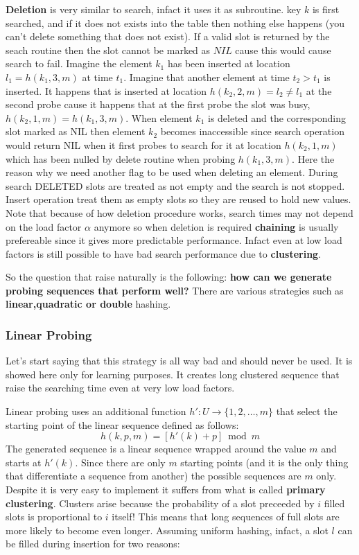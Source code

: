 \textbf{Deletion} is very similar to search, infact it uses it as subroutine. key $k$ is first searched, and if it does not exists into the table then nothing else happens (you can't delete something that does not exist). If a valid slot is returned by the seach routine then the slot cannot be marked as $NIL$ cause this would cause search to fail. Imagine the element $k_1$ has been inserted at location $l_1=h(k_1,3,m)$ at time $t_1$. Imagine that another element at time $t_2 > t_1$ is inserted. It happens that is  inserted at location $h(k_2,2,m)=l_2 \neq l_1$  at the second probe cause it happens that at the first probe the slot was busy, $h(k_2,1,m)= h(k_1,3,m)$. When element $k_1$ is deleted and the corresponding slot marked as NIL then element $k_2$ becomes inaccessible since search operation would return NIL when it first probes to search for it at location $h(k_2,1,m)$ which has been nulled by delete routine when probing $h(k_1,3,m)$. Here the reason why we need another flag to be used when deleting an element.
During search DELETED slots are treated as not empty and the search is not stopped. Insert operation treat them as empty slots so they are reused to hold new values.
Note that because of how deletion procedure works, search times may not depend on the load factor $\alpha$ anymore so when deletion is required \textbf{chaining} is usually prefereable since it gives more predictable performance. Infact even at low load factors is still possible to have bad search performance due to \textbf{clustering}. 

So the question that raise naturally is the following: \textbf{how can we generate probing sequences that perform well?}
There are various strategies such as \textbf{linear,quadratic or double} hashing.
\subsubsection{Linear Probing}
Let's start saying that this strategy is all way bad and should never be used. It is showed here only for learning purposes. It creates long clustered sequence that raise the searching time even at very low load factors. 

Linear probing uses an additional function $h':U \rightarrow \{	1,2,\ldots, m\} $ that select the starting point of the linear sequence defined as follows:
\[
h(k,p,m) = [h'(k) + p]\bmod m
\]
The generated sequence is a linear sequence wrapped around the value $m$ and starts at $h'(k)$. Since there are only $m$ starting points (and it is the only thing that differentiate a sequence from another) the possible sequences are $m$ only. Despite it is very easy to implement it suffers from what is called \textbf{primary clustering}. Clusters arise because the probability of a slot preceeded by $i$ filled slots is proportional to $i$ itself! This means that long sequences of full slots are more likely to become even longer. Assuming uniform hashing, infact, a slot $l$ can be filled during insertion for two reasons:

